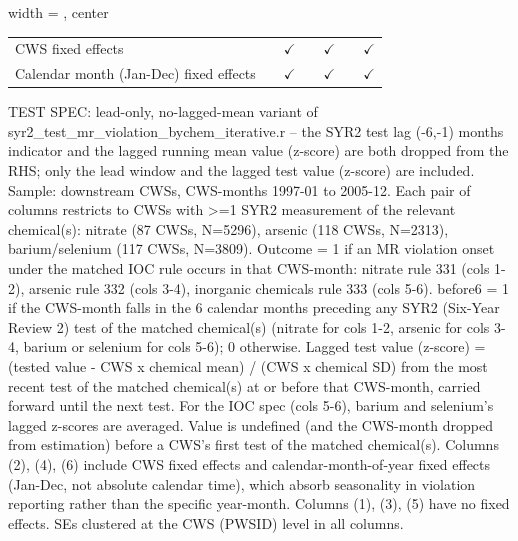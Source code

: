 \begin{table}[htbp]
\begin{adjustbox}{width = \textwidth, center}
\begin{tabular}{lcccccc}
          \\
         
         CWS fixed effects                      &               & $\checkmark$  &          & $\checkmark$  &               & $\checkmark$\\   
         Calendar month (Jan-Dec) fixed effects &               & $\checkmark$  &          & $\checkmark$  &               & $\checkmark$\\   
         
         \bottomrule
         
      \end{tabular}
      
      
      
   \end{adjustbox}
      {\tiny\linespread{1}\selectfont \par \raggedright 
   TEST SPEC: lead-only, no-lagged-mean variant of syr2\_test\_mr\_violation\_bychem\_iterative.r -- the SYR2 test lag (-6,-1) months indicator and the lagged running mean value (z-score) are both dropped from the RHS; only the lead window and the lagged test value (z-score) are included. Sample: downstream CWSs, CWS-months 1997-01 to 2005-12. Each pair of columns restricts to CWSs with >=1 SYR2 measurement of the relevant chemical(s): nitrate (87 CWSs, N=5296), arsenic (118 CWSs, N=2313), barium/selenium (117 CWSs, N=3809). Outcome = 1 if an MR violation onset under the matched IOC rule occurs in that CWS-month: nitrate rule 331 (cols 1-2), arsenic rule 332 (cols 3-4), inorganic chemicals rule 333 (cols 5-6). before6 = 1 if the CWS-month falls in the 6 calendar months preceding any SYR2 (Six-Year Review 2) test of the matched chemical(s) (nitrate for cols 1-2, arsenic for cols 3-4, barium or selenium for cols 5-6); 0 otherwise. Lagged test value (z-score) = (tested value - CWS x chemical mean) / (CWS x chemical SD) from the most recent test of the matched chemical(s) at or before that CWS-month, carried forward until the next test. For the IOC spec (cols 5-6), barium and selenium's lagged z-scores are averaged. Value is undefined (and the CWS-month dropped from estimation) before a CWS's first test of the matched chemical(s). Columns (2), (4), (6) include CWS fixed effects and calendar-month-of-year fixed effects (Jan-Dec, not absolute calendar time), which absorb seasonality in violation reporting rather than the specific year-month. Columns (1), (3), (5) have no fixed effects. SEs clustered at the CWS (PWSID) level in all columns.}
   
\end{table}


